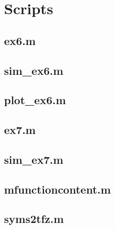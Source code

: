 \section*{Scripts}
    \subsection*{ex6.m}
    \label{subsec:ex6}
    

    \subsection*{sim\_ex6.m}
    \label{subsec:simex6}
    

    \subsection*{plot\_ex6.m}
    \label{subsec:plotex6}
    
    
    \subsection*{ex7.m}
    \label{subsec:ex6}
    
    
    \subsection*{sim\_ex7.m}
    \label{subsec:simex6}
    
    
    \subsection*{mfunctioncontent.m}
    \label{subsec:mfunctioncontent}
    

    \subsection*{syms2tfz.m}
    \label{subsec:syms2tfz}
    
    
